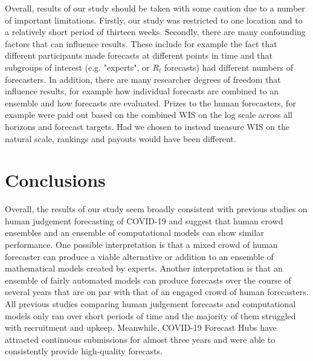 \documentclass[10pt,a4paper,twocolumn]{article}
\begin{document}

Overall, results of our study should be taken with some caution due to a number of important limitations. Firstly, our study was restricted to one location and to a relatively short period of thirteen weeks. Secondly, there are many confounding factors that can influence results. These include for example the fact that different participants made forecasts at different points in time and that subgroups of interest (e.g. "experts", or $R_t$ forecasts) had different numbers of forecasters. In addition, there are many researcher degrees of freedom that influence results, for example how individual forecasts are combined to an ensemble and how forecasts are evaluated. Prizes to the human forecasters, for example were paid out based on the combined WIS on the log scale across all horizons and forecast targets. Had we chosen to instead measure WIS on the natural scale, rankings and payouts would have been different. 


\section*{Conclusions}

Overall, the results of our study seem broadly consistent with previous studies on human judgement forecasting of COVID-19 and suggest that human crowd ensembles and an ensemble of computational models can show similar performance. One possible interpretation is that a mixed crowd of human forecaster can produce a viable alternative or addition to an ensemble of mathematical models created by experts. Another interpretation is that an ensemble of fairly automated models can produce forecasts over the course of several years that are on par with that of an engaged crowd of human forecasters. All previous studies comparing human judgement forecasts and computational models only ran over short periods of time and the majority of them struggled with recruitment and upkeep. Meanwhile, COVID-19 Forecast Hubs have attracted continuous submissions for almost three years and were able to consistently provide high-quality forecasts. 
\end{document}
